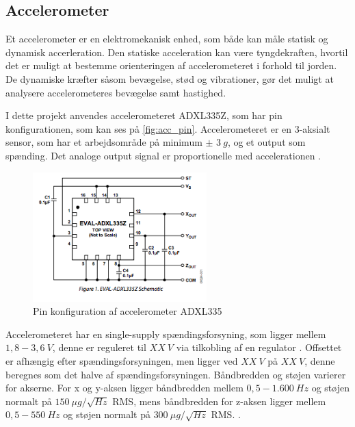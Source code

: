 \subsection{Accelerometer} \label{sec:acc}
Et accelerometer er en elektromekanisk enhed, som både kan måle statisk og dynamisk accerleration. Den statiske acceleration kan være tyngdekraften, hvortil det er muligt at bestemme orienteringen af accelerometeret i forhold til jorden. De dynamiske kræfter såsom bevægelse, stød og vibrationer, gør det muligt at analysere accelerometeres bevægelse samt hastighed. 

I dette projekt anvendes accelerometeret ADXL335Z, som har pin konfigurationen, som kan ses på \autoref{fig:acc_pin}. Accelerometeret er en 3-aksialt sensor, som har et arbejdsområde på minimum $\pm$ $3~g$, og et output som spænding. Det analoge output signal er proportionelle med accelerationen \citep{analogdevices2009}. 


\begin{figure}[H]
\centering
\includegraphics[width=0.6\textwidth]{figures/acc_pin.png}
\caption{Pin konfiguration af accelerometer ADXL335 \citep{analogdevices2009}}
\label{fig:acc_pin}
\end{figure}

\noindent
Accelerometeret har en single-supply spændingsforsyning, som ligger mellem $1,8 - 3,6~V$, denne er reguleret til $XX~V$ via tilkobling af en regulator . Offsettet er afhængig efter spændingsforsyningen, men ligger ved $XX~V$ på $XX~V$, denne beregnes som det halve af spændingsforsyningen. Båndbredden og støjen varierer for akserne. For x og y-aksen ligger båndbredden mellem $0,5 - 1.600~Hz$ og støjen normalt på $150~\mu g/\sqrt{Hz}$ RMS, mens båndbredden for z-aksen ligger mellem $0,5 - 550~Hz$ og støjen normalt på $300~\mu g/\sqrt{Hz}$ RMS.  \citep{analogdevices2010}. 

